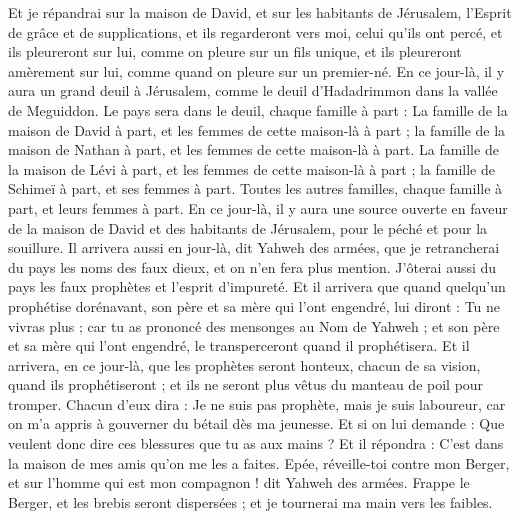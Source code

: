 \begin{multicols}{2}
Et je répandrai sur la maison de David, et sur les habitants de Jérusalem, l'Esprit de grâce et de supplications, et ils regarderont vers moi, celui qu'ils ont percé, et ils pleureront sur lui, comme on pleure sur un fils unique, et ils pleureront amèrement sur lui, comme quand on pleure sur un premier-né.
En ce jour-là, il y aura un grand deuil à Jérusalem, comme le deuil d'Hadadrimmon dans la vallée de Meguiddon.
Le pays sera dans le deuil, chaque famille à part : La famille de la maison de David à part, et les femmes de cette maison-là à part ; la famille de la maison de Nathan à part, et les femmes de cette maison-là à part.
La famille de la maison de Lévi à part, et les femmes de cette maison-là à part ; la famille de Schimeï à part, et ses femmes à part.
Toutes les autres familles, chaque famille à part, et leurs femmes à part.
\VerseOne{}En ce jour-là, il y aura une source ouverte en faveur de la maison de David et des habitants de Jérusalem, pour le péché et pour la souillure.
Il arrivera aussi en jour-là, dit Yahweh des armées, que je retrancherai du pays les noms des faux dieux, et on n'en fera plus mention. J'ôterai aussi du pays les faux prophètes et l'esprit d'impureté.
Et il arrivera que quand quelqu'un prophétise dorénavant, son père et sa mère qui l'ont engendré, lui diront : Tu ne vivras plus ; car tu as prononcé des mensonges au Nom de Yahweh ; et son père et sa mère qui l'ont engendré, le transperceront quand il prophétisera.
Et il arrivera, en ce jour-là, que les prophètes seront honteux, chacun de sa vision, quand ils prophétiseront ; et ils ne seront plus vêtus du manteau de poil pour tromper.
Chacun d'eux dira : Je ne suis pas prophète, mais je suis laboureur, car on m'a appris à gouverner du bétail dès ma jeunesse.
Et si on lui demande : Que veulent donc dire ces blessures que tu as aux mains ? Et il répondra : C'est dans la maison de mes amis qu'on me les a faites.
Epée, réveille-toi contre mon Berger, et sur l'homme qui est mon compagnon ! dit Yahweh des armées. Frappe le Berger, et les brebis seront dispersées ; et je tournerai ma main vers les faibles.

\end{multicols}
